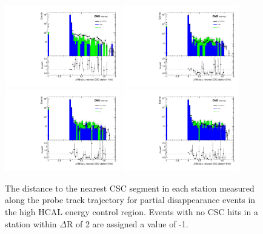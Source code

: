 \begin{figure}[htbp]
	\label{fig:BDTcscvalid}
	\centering
	\includegraphics[width=0.45\textwidth]{figures/highHcal_cscDr_station0.pdf}
	\hspace{0.01\textwidth}
	\includegraphics[width=0.45\textwidth]{figures/highHcal_cscDr_station1.pdf}
	\vspace{0.01\textwidth}
	\includegraphics[width=0.45\textwidth]{figures/highHcal_cscDr_station2.pdf}
	\hspace{0.01\textwidth}
	\includegraphics[width=0.45\textwidth]{figures/highHcal_cscDr_station3.pdf} 
        \caption[CSC Segment Validation]{The distance to the nearest CSC segment in each station measured along the probe track trajectory for partial disappearance events in the high HCAL energy control region. Events with no CSC hits in a station within $\Delta$R of 2 are assigned a value of -1.}
\end{figure}


